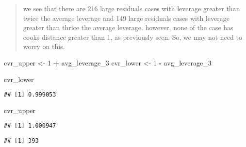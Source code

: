 \documentclass[
]{article}
\newenvironment{Shaded}{\begin{snugshade}}{\end{snugshade}}
\newcommand{\DecValTok}[1]{\textcolor[rgb]{0.00,0.00,0.81}{#1}}
\newcommand{\KeywordTok}[1]{\textcolor[rgb]{0.13,0.29,0.53}{\textbf{#1}}}
\newcommand{\NormalTok}[1]{#1}
\newcommand{\OperatorTok}[1]{\textcolor[rgb]{0.81,0.36,0.00}{\textbf{#1}}}
\newcommand{\StringTok}[1]{\textcolor[rgb]{0.31,0.60,0.02}{#1}}
\begin{document}
\begin{quote}
we see that there are 216 large residuals cases with leverage greater
than twice the average leverage and 149 large residuals cases with
leverage greater than thrice the average leverage. however, none of the
case has cooks distance greater than 1, as previously seen. So, we may
not need to worry on this.
\end{quote}

\begin{Shaded}
\begin{Highlighting}[]
\NormalTok{cvr_upper <-}\StringTok{ }\DecValTok{1} \OperatorTok{+}\StringTok{ }\NormalTok{avg_leverage_}\DecValTok{3}
\NormalTok{cvr_lower <-}\StringTok{ }\DecValTok{1} \OperatorTok{-}\StringTok{ }\NormalTok{avg_leverage_}\DecValTok{3}

\NormalTok{cvr_lower}
\end{Highlighting}
\end{Shaded}

\begin{verbatim}
## [1] 0.999053
\end{verbatim}

\begin{Shaded}
\begin{Highlighting}[]
\NormalTok{cvr_upper}
\end{Highlighting}
\end{Shaded}

\begin{verbatim}
## [1] 1.000947
\end{verbatim}

\begin{Shaded}
\end{Shaded}

\begin{verbatim}
## [1] 393
\end{verbatim}

\begin{Shaded}
\end{Shaded}
\end{document}

